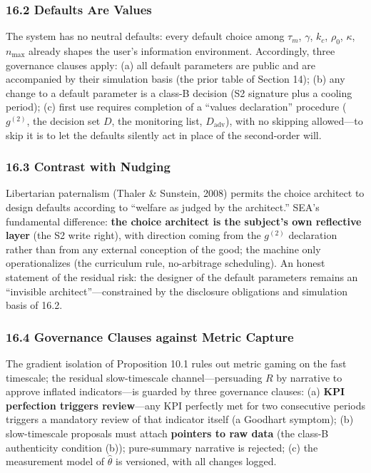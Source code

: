 \documentclass[
  11pt]{article}
\begin{document}
\subsubsection{16.2 Defaults Are Values}\label{defaults-are-values}

The system has no neutral defaults: every default choice among
\(\tau_m\), \(\gamma\), \(k_c\), \(\rho_0\), \(\kappa\), \(n_{\max}\)
already shapes the user's information environment. Accordingly, three
governance clauses apply: (a) all default parameters are public and are
accompanied by their simulation basis (the prior table of Section 14);
(b) any change to a default parameter is a class-B decision (S2
signature plus a cooling period); (c) first use requires completion of a
``values declaration'' procedure (\(g^{(2)}\), the decision set \(D\),
the monitoring list, \(D_{\mathrm{adv}}\)), with no skipping
allowed---to skip it is to let the defaults silently act in place of the
second-order will.

\subsubsection{16.3 Contrast with Nudging}\label{contrast-with-nudging}

Libertarian paternalism (Thaler \& Sunstein, 2008) permits the choice
architect to design defaults according to ``welfare as judged by the
architect.'' SEA's fundamental difference: \textbf{the choice architect
is the subject's own reflective layer} (the S2 write right), with
direction coming from the \(g^{(2)}\) declaration rather than from any
external conception of the good; the machine only operationalizes (the
curriculum rule, no-arbitrage scheduling). An honest statement of the
residual risk: the designer of the default parameters remains an
``invisible architect''---constrained by the disclosure obligations and
simulation basis of 16.2.

\subsubsection{16.4 Governance Clauses against Metric
Capture}\label{governance-clauses-against-metric-capture}

The gradient isolation of Proposition 10.1 rules out metric gaming on
the fast timescale; the residual slow-timescale channel---persuading
\(R\) by narrative to approve inflated indicators---is guarded by three
governance clauses: (a) \textbf{KPI perfection triggers review}---any
KPI perfectly met for two consecutive periods triggers a mandatory
review of that indicator itself (a Goodhart symptom); (b) slow-timescale
proposals must attach \textbf{pointers to raw data} (the class-B
authenticity condition (b)); pure-summary narrative is rejected; (c) the
measurement model of \(\hat\theta\) is versioned, with all changes
logged.
\end{document}
